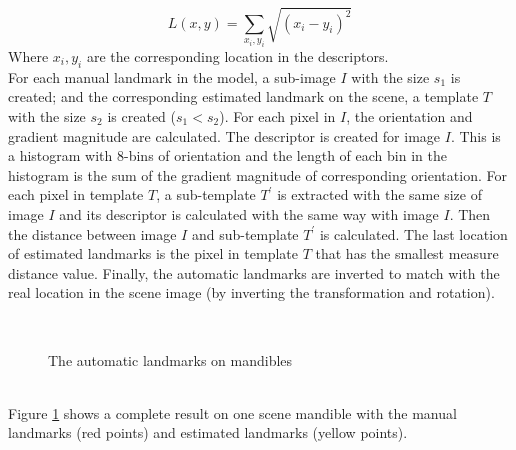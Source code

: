 \documentclass[twoside,twocolumn,10pt]{article}
\begin{document}
\begin{equation}
\label{eq:cross-correlation}
	L(x,y) = \sum\limits_{x_i,y_i}\sqrt{(x_i-y_i)^2}
\end{equation}
Where $x_i, y_i $ are the corresponding location in the descriptors.\\[0.2cm]
For each manual landmark in the model, a sub-image \textit{$I$} with
the size \textit{$s_1$} is created; and the corresponding estimated
landmark on the scene, a template \textit{$T$} with the size
\textit{$s_2$} is created (\textit{$s_1 < s_2$}). For each pixel in
\textit{$I$}, the orientation and gradient magnitude are
calculated. The descriptor is created for image \textit{$I$}. This is
a histogram with 8-bins of orientation and the length of each bin in the histogram is the sum of
the gradient magnitude of corresponding orientation. For each pixel in template \textit{$T$}, a
sub-template \textit{$T^{'}$} is extracted with the same size of
image \textit{$I$} and its descriptor is calculated with the same way
with image \textit{$I$}. Then the distance between image \textit{$I$}
and sub-template \textit{$T^{'}$} is calculated. The last location of
estimated landmarks is the pixel in template \textit{$T$} that has the smallest measure
distance value. Finally, the automatic landmarks are inverted to match
with the real location in the scene image (by inverting the
transformation and rotation).
\begin{figure}[h]
\centering
{}~~
\caption{The automatic landmarks on mandibles}
\label{figresult}
\end{figure}~\\
Figure \ref{figresult} shows a complete result on one scene mandible with the manual landmarks (red points) and estimated landmarks (yellow points).
\end{document}
